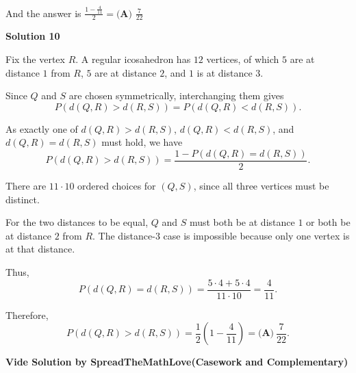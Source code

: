 \begin{enumerate}
 And the answer is $\frac{1-\frac{4}{11}}{2} = \boxed{ \textbf{(A) } \frac{7}{22}}$




\textbf{Solution 10}

Fix the vertex $R$. A regular icosahedron has $12$ vertices, of which $5$ are at distance $1$ from $R$, $5$ are at distance $2$, and $1$ is at distance $3$.

 Since $Q$ and $S$ are chosen symmetrically, interchanging them gives
 \[P(d(Q,R)>d(R,S))=P(d(Q,R)<d(R,S)).\]

 As exactly one of $d(Q,R)>d(R,S)$, $d(Q,R)<d(R,S)$, and $d(Q,R)=d(R,S)$ must hold, we have
 \[P(d(Q,R)>d(R,S))=\frac{1-P(d(Q,R)=d(R,S))}{2}.\]

 There are $11\cdot10$ ordered choices for $(Q,S)$, since all three vertices must be distinct.

 For the two distances to be equal, $Q$ and $S$ must both be at distance $1$ or both be at distance $2$ from $R$. The distance-$3$ case is impossible because only one vertex is at that distance.

 Thus,
 \[P(d(Q,R)=d(R,S)) =\frac{5\cdot4+5\cdot4}{11\cdot10} =\frac4{11}.\]

 Therefore,
 \[P(d(Q,R)>d(R,S)) =\frac12\left(1-\frac4{11}\right) =\boxed{\textbf{(A)}\ \frac7{22}}.\]

 


 \textbf{Vide Solution by SpreadTheMathLove(Casework and Complementary)} 


\end{enumerate}